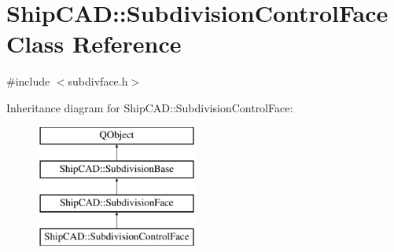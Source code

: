 \hypertarget{classShipCAD_1_1SubdivisionControlFace}{\section{Ship\-C\-A\-D\-:\-:Subdivision\-Control\-Face Class Reference}
\label{classShipCAD_1_1SubdivisionControlFace}
}


{\ttfamily \#include $<$subdivface.\-h$>$}

Inheritance diagram for Ship\-C\-A\-D\-:\-:Subdivision\-Control\-Face\-:\begin{figure}[H]
\begin{center}
\leavevmode
\includegraphics[height=4.000000cm]{classShipCAD_1_1SubdivisionControlFace}
\end{center}
\end{figure}
